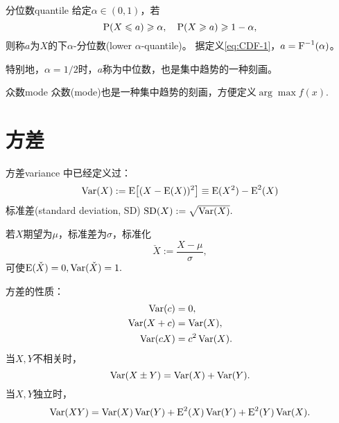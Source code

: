 \begin{definition}{分位数}{quantile}
	给定$\alpha\in(0,1)$，若
	\[
		\P(X\leqslant a)\geqslant\alpha,\quad\P(X\geqslant a)\geqslant 1-\alpha,
	\]
	则称$a$为$X$的下$\alpha$-分位数(lower $\alpha$-quantile)。
	据定义\eqref{eq:CDF-1}，$a=\CDF\inv(\alpha)$。

	特别地，$\alpha=1/2$时，$a$称为中位数，也是集中趋势的一种刻画。
\end{definition}

\begin{definition}
	{众数}{mode}
	众数(mode)也是一种集中趋势的刻画，方便定义$\arg\max f(x).$
\end{definition}

\section{方差}

\begin{definition}
	{方差}{variance}
	 中已经定义过：
	\begin{equation}
		\Var(X):=\E\bigfkh{(X-\E(X))^2}\equiv\E(X^2)-\E^2(X)
	\end{equation}
	标准差(standard deviation, SD) $\SD(X):=\sqrt{\Var(X)}.$
\end{definition}

\begin{corollary}
	若$X$期望为$\mu$，标准差为$\sigma$，标准化
	\begin{equation}
		\check X:=\frac{X-\mu}{\sigma},
	\end{equation}
	可使$\E(\check X)=0,\Var(\check X)=1.$
\end{corollary}

\begin{corollary}
	方差的性质：
	\begin{subequations}
		\begin{align}
			\Var(c)&=0,\\
			\Var(X+c)&=\Var(X),\\
			\Var(cX)&=c^2\Var(X).
		\end{align}
	\end{subequations}
	当$X,Y$不相关时，
	\begin{equation}
		\Var(X\pm Y)=\Var(X)+\Var(Y).
	\end{equation}
	当$X,Y$独立时，
	\begin{equation}
		\Var(XY)=\Var(X)\Var(Y)+\E^2(X)\Var(Y)+\E^2(Y)\Var(X).
	\end{equation}
\end{corollary}

